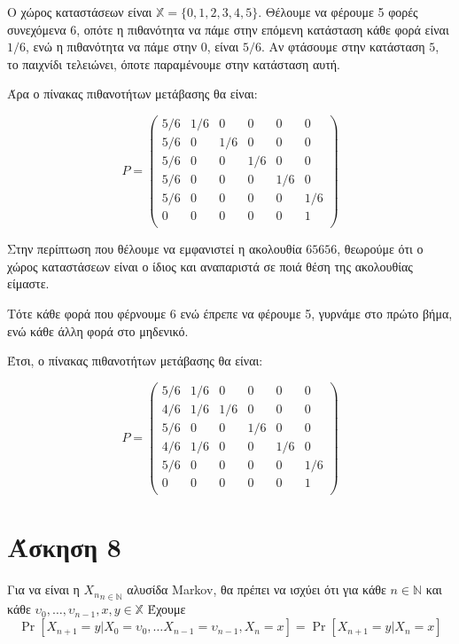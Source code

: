 \documentclass{article}
\newcommand{\english}[1]{\foreignlanguage{english}{{#1}}}
\begin{document}
Ο χώρος καταστάσεων είναι $\mathbb{X} = \{0, 1, 2, 3, 4, 5\}$. Θέλουμε να φέρουμε 5 φορές συνεχόμενα 6, οπότε η πιθανότητα να πάμε στην επόμενη κατάσταση κάθε φορά είναι $1/6$, ενώ η πιθανότητα να πάμε στην $0$, είναι $5/6$. Αν φτάσουμε στην κατάσταση $5$, το παιχνίδι τελειώνει, όποτε παραμένουμε στην κατάσταση αυτή.

Άρα ο πίνακας πιθανοτήτων μετάβασης θα είναι:

\begin{equation*}
    P = 
    \begin{pmatrix}
        5/6 & 1/6 & 0 & 0 & 0 & 0\\
       5/6 & 0 & 1/6 & 0 & 0 & 0\\
       5/6 & 0 & 0 & 1/6 & 0 & 0\\
        5/6 & 0 & 0 & 0 & 1/6 & 0\\
        5/6 & 0 & 0 & 0 & 0 & 1/6\\
        0 & 0 & 0 & 0 & 0 & 1\\
    \end{pmatrix}
\end{equation*}

Στην περίπτωση που θέλουμε να εμφανιστεί η ακολουθία $65656$, θεωρούμε ότι ο χώρος καταστάσεων είναι ο ίδιος και αναπαριστά σε ποιά θέση της ακολουθίας είμαστε.

Τότε κάθε φορά που φέρνουμε 6 ενώ έπρεπε να φέρουμε 5, γυρνάμε στο πρώτο βήμα, ενώ κάθε άλλη φορά στο μηδενικό.

Έτσι, ο πίνακας πιθανοτήτων μετάβασης θα είναι:

\begin{equation*}
    P = 
    \begin{pmatrix}
        5/6 & 1/6 & 0 & 0 & 0 & 0\\
       4/6 & 1/6 & 1/6 & 0 & 0 & 0\\
       5/6 & 0 & 0 & 1/6 & 0 & 0\\
        4/6 & 1/6 & 0 & 0 & 1/6 & 0\\
        5/6 & 0 & 0 & 0 & 0 & 1/6\\
        0 & 0 & 0 & 0 & 0 & 1\\
    \end{pmatrix}
\end{equation*}

\section*{Άσκηση 8}

Για να είναι η ${X_n}_{n \in \mathbb{N}}$ αλυσίδα \english{Markov}, θα πρέπει να ισχύει ότι για κάθε $n \in \mathbb{N}$ και κάθε $υ_0, \dots, υ_{n-1}, x, y \in \mathbb{X}$ Έχουμε
\begin{equation*}
    \Pr{[X_{n+1} = y | X_0 = υ_0, \dots X_{n-1} = υ_{n-1}, X_n = x]} = \Pr{[X_{n+1} = y | X_n = x]}
\end{equation*}
\end{document}
